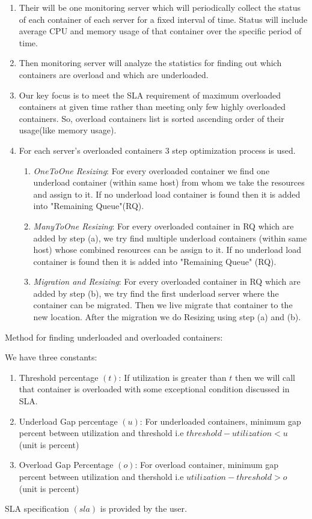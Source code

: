\documentclass[a4paper, 11pt]{article}
\begin{document}
\begin{enumerate}
 \item Their will be one monitoring server which will periodically collect the status of each container of each server for a fixed interval of time. Status will include average CPU and memory usage of that container over the specific period of time.
 
 \item Then monitoring server will analyze the statistics for finding out which containers are overload and which are underloaded.
 
 \item Our key focus is to meet the SLA requirement of maximum overloaded containers at given time rather than meeting only few highly overloaded containers. So, overload containers list is sorted ascending order of their usage(like memory usage).
 
 \item For each server's overloaded containers 3 step optimization process is used.
 \begin{enumerate}
  \item \textit{OneToOne Resizing}: For every overloaded container we find one underload container (within same host) from whom we take the resources and assign to it. If no underload load container is found then it is added into "Remaining Queue"(RQ).
  
  \item \textit{ManyToOne Resizing}: For every overloaded container in RQ which are added by step (a), we try find multiple underload containers (within same host) whose combined resources can be  assign to it. If no underload load container is found then it is added into "Remaining Queue" (RQ).
  
  \item \textit{Migration and Resizing}: For every overloaded container in RQ which are added by step (b), we try find the first underload server where the container can be migrated. Then we live migrate that container to the new location. After the migration we do Resizing using step (a) and (b).
 \end{enumerate}
\end{enumerate}

\noindent Method for finding underloaded and overloaded containers:

\noindent We have three constants:
\begin{enumerate}
 \item Threshold percentage $(t)$: If utilization is greater than $t$ then we will call that container is overloaded with some exceptional condition discussed in SLA.
 \item Underload Gap percentage $(u)$: For underloaded containers, minimum gap percent between utilization and threshold i.e  $threshold - utilization < u$ (unit is percent)
 \item Overload Gap Percentage $(o)$: For overload container, minimum gap percent between utilization and thershold i.e  $utilization -threshold > o$ (unit is percent)
\end{enumerate}
\noindent SLA specification $(sla)$ is provided by the user.
\end{document}
